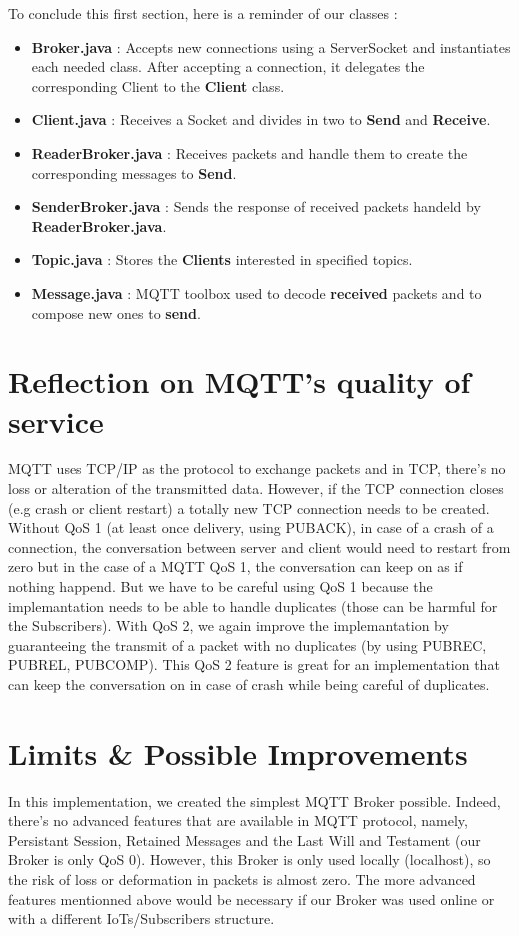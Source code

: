 \documentclass[12pt]{article}
\begin{document}
To conclude this first section, here is a reminder of our classes :
\begin{itemize}
	\item \textbf{Broker.java} : Accepts new connections using a ServerSocket and instantiates each needed class. After accepting a connection, it delegates 
	the corresponding Client to the \textbf{Client} class.
	\item \textbf{Client.java} : Receives a Socket and divides in two to \textbf{Send} and \textbf{Receive}.
	\item \textbf{ReaderBroker.java} : Receives packets and handle them to create the corresponding messages to \textbf{Send}.
	\item \textbf{SenderBroker.java} : Sends the response of received packets handeld by \textbf{ReaderBroker.java}.
	\item \textbf{Topic.java} : Stores the \textbf{Clients} interested in specified topics.
	\item \textbf{Message.java} : MQTT toolbox used to decode \textbf{received} packets and to compose new ones to \textbf{send}.
\end{itemize}

\section{Reflection on MQTT's quality of service}
MQTT uses TCP/IP as the protocol to exchange packets and in TCP, there's no loss or alteration of the transmitted data. However, if the TCP connection 
closes (e.g crash or client restart) a totally new TCP connection needs to be created. Without QoS 1 (at least once delivery, using PUBACK), in case of a crash of a connection, 
the conversation between server and client would need to restart from zero but in the case of a MQTT QoS 1, the conversation can keep on as if nothing happend. But we have to be careful using QoS 1 because 
the implemantation needs to be able to handle duplicates (those can be harmful for the Subscribers). With QoS 2, we again improve the implemantation by guaranteeing the transmit of a packet with no duplicates (by using PUBREC, PUBREL, PUBCOMP). 
This QoS 2 feature is great for an implementation that can keep the conversation on in case of crash while being careful of duplicates.

\section{Limits \& Possible Improvements}
In this implementation, we created the simplest MQTT Broker possible. Indeed, there's no advanced features that are available in MQTT protocol, namely, Persistant Session, 
Retained Messages and the Last Will and Testament (our Broker is only QoS 0). However, this Broker is only used locally (localhost), so the risk of loss or deformation in packets is almost zero. 
The more advanced features mentionned above would be necessary if our Broker was used online or with a different IoTs/Subscribers structure. 
\end{document}
